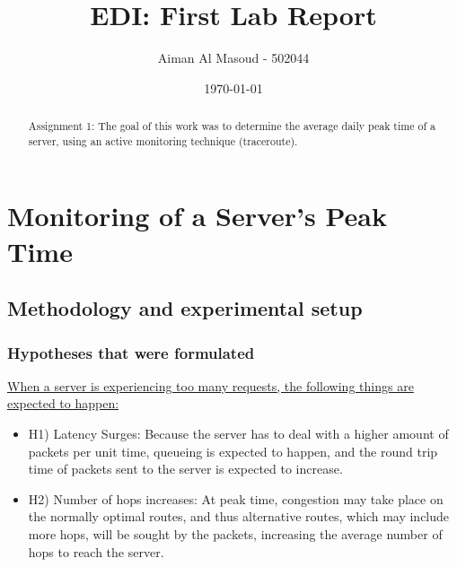 \documentclass[a4paper,10pt]{article}
\begin{document}
\title{EDI: First Lab Report}
\author{Aiman Al Masoud - 502044}
\date{\today}

\maketitle

\begin{abstract}

Assignment 1: The goal of this work was to determine the average daily peak time of a server, using an active monitoring technique (traceroute).

\end{abstract}

\clearpage

\setcounter{page}{1}

\section{Monitoring of a Server's Peak Time}


\subsection{Methodology and experimental setup}


\maketitle
\subsubsection{Hypotheses that were formulated}


\underline{When a server is experiencing too many requests, the following things are expected to happen: }


\begin{itemize}

\item \label{hyp1} H1) Latency Surges: Because the server has to deal with a higher amount of packets per unit time, queueing is expected to happen, and the round trip time of packets sent to the server is expected to increase.

\item H2) Number of hops increases: At peak time, congestion may take place on the normally optimal routes, and thus alternative routes, which may include more hops, will be sought by the packets, increasing the average number of hops to reach the server.

\end{itemize}
\end{document}
